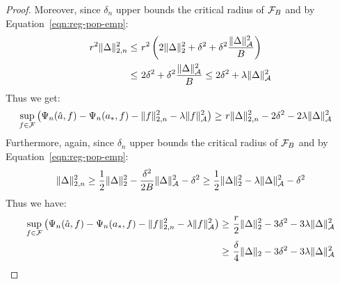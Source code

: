 \begin{proof}
Moreover, since $\delta_n$ upper bounds the critical radius of ${\mathcal F}_{B}$ and by Equation~\eqref{eqn:reg-pop-emp}:
\begin{align}
    r^2 \|\Delta\|_{2,n}^2
    \leq~& r^2 \left(2\|\Delta\|_2^2 + \delta^2 + \delta^2 \frac{\|\Delta\|_{{\mathcal A}}^2}{B}\right)\\
    \leq~& 2\delta^2 + \delta^2 \frac{\|\Delta\|_{{\mathcal A}}^2}{B} \leq 2\delta^2 + \lambda \|\Delta\|_{{\mathcal A}}^2
\end{align}
Thus we get:
\begin{align}
    \sup_{f \in {\mathcal F}} \left(\Psi_n(\hat{a}, f) - \Psi_n(a_*, f) - \|f\|_{2,n}^2 - \lambda \|f\|_{{\mathcal A}}^2\right) \geq~& r \|\Delta\|_{2,n}^2 - 2\delta^2 - 2\lambda \|\Delta\|_{{\mathcal A}}^2
\end{align}
Furthermore, again, since $\delta_n$ upper bounds the critical radius of ${\mathcal F}_{B}$ and by Equation~\eqref{eqn:reg-pop-emp}:
\begin{align}
    \|\Delta\|_{2,n}^2 \geq \frac{1}{2} \|\Delta\|_2^2 - \frac{\delta^2}{2B}\|\Delta\|_{{\mathcal A}}^2 - \delta^2 \geq \frac{1}{2} \|\Delta\|_2^2 - \lambda\|\Delta\|_{{\mathcal A}}^2 - \delta^2
\end{align}
Thus we have:
\begin{align}
    \sup_{f \in {\mathcal F}} \left(\Psi_n(\hat{a}, f) - \Psi_n(a_*, f) - \|f\|_{2,n}^2 - \lambda \|f\|_{{\mathcal A}}^2\right) \geq~& \frac{r}{2} \|\Delta\|_{2}^2 - 3\delta^2 - 3\lambda \|\Delta\|_{{\mathcal A}}^2\\
    \geq~& \frac{\delta}{4} \|\Delta\|_2  - 3\delta^2 - 3\lambda \|\Delta\|_{{\mathcal A}}^2
\end{align}



\end{proof}
